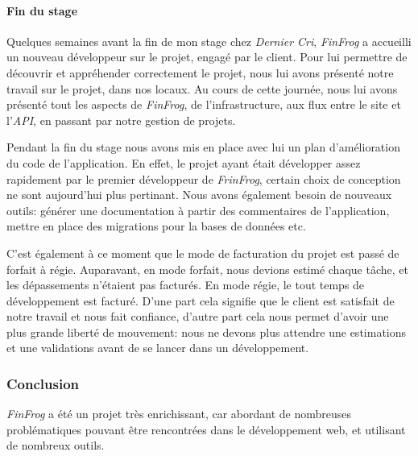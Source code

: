 \documentclass[12pt,a4paper]{article}
\begin{document}
  \paragraph{Fin du stage}\label{fin-du-stage}

  Quelques semaines avant la fin de mon stage chez \emph{Dernier Cri},
  \emph{FinFrog} a accueilli un nouveau développeur sur le projet, engagé
  par le client. Pour lui permettre de découvrir et appréhender
  correctement le projet, nous lui avons présenté notre travail sur le
  projet, dans nos locaux. Au cours de cette journée, nous lui avons
  présenté tout les aspects de \emph{FinFrog}, de l'infrastructure, aux
  flux entre le site et l'\emph{API}, en passant par notre gestion de
  projets.

  \bigskip

  Pendant la fin du stage nous avons mis en place avec lui un plan
  d'amélioration du code de l'application. En effet, le projet ayant était
  développer assez rapidement par le premier développeur de
  \emph{FrinFrog}, certain choix de conception ne sont aujourd'hui plus
  pertinant. Nous avons également besoin de nouveaux outils: générer une
  documentation à partir des commentaires de l'application, mettre en
  place des migrations pour la bases de données etc.

  \bigskip

  C'est également à ce moment que le mode de facturation du projet est
  passé de forfait à régie. Auparavant, en mode forfait, nous devions
  estimé chaque tâche, et les dépassements n'étaient pas facturés. En mode
  régie, le tout temps de développement est facturé. D'une part cela
  signifie que le client est satisfait de notre travail et nous fait
  confiance, d'autre part cela nous permet d'avoir une plus grande liberté
  de mouvement: nous ne devons plus attendre une estimations et une
  validations avant de se lancer dans un développement.

  \bigskip

  \subsubsection{Conclusion}\label{conclusion-1}

  \emph{FinFrog} a été un projet très enrichissant, car abordant de
  nombreuses problématiques pouvant être rencontrées dans le développement
  web, et utilisant de nombreux outils.

  \bigskip
\end{document}

